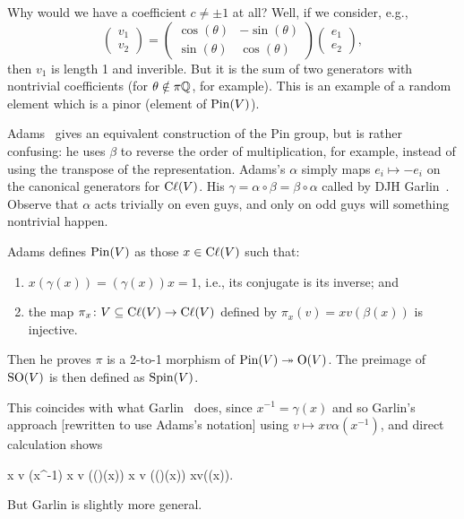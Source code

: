 Why would we have a coefficient $c\neq\pm1$ at all? Well, if we
consider, e.g.,
\begin{equation}
\begin{pmatrix}
v_{1}\\ v_{2}
\end{pmatrix} = \begin{pmatrix}\cos(\theta) & -\sin(\theta)\\
\sin(\theta) & \cos(\theta)
\end{pmatrix}
\begin{pmatrix}
e_{1}\\ e_{2}
\end{pmatrix},
\end{equation}
then $v_{1}$ is length 1 and inverible. But it is the sum of two
generators with nontrivial coefficients (for $\theta\notin\pi\mathbb{Q}$, for
example). This is an example of a random element which is a pinor
(element of $\operatorname{Pin}(V)$).

\begin{remark}
Adams~\cite{adams1996:ex} gives an equivalent construction of the Pin
group, but is rather confusing: he uses $\beta$ to reverse the order of
multiplication, for example, instead of using the transpose of the
representation. Adams's $\alpha$ simply maps $e_{i}\mapsto-e_{i}$ on the
canonical generators for $\mathrm{C}\ell(V)$. His
$\gamma=\alpha\circ\beta=\beta\circ\alpha$ called 
by DJH Garlin~\cite[pg.94]{Garling:2011zz}. Observe that $\alpha$ acts
trivially on even guys, and only on odd guys will something nontrivial
happen. 
\end{remark}

\begin{remark}
Adams defines $\operatorname{Pin}(V)$ as those $x\in\mathrm{C}\ell(V)$ such that:
\begin{enumerate}
\item $x(\gamma(x))=(\gamma(x))x=1$, i.e., its conjugate is its inverse; and
\item the map $\pi_{x}\colon V\subseteq\mathrm{C}\ell(V)\to\mathrm{C}\ell(V)$ defined by $\pi_{x}(v)=xv(\beta(x))$
is injective.
\end{enumerate}
Then he proves $\pi$ is a 2-to-1 morphism of $\operatorname{Pin}(V)\twoheadrightarrow\mathrm{O}(V)$. The
preimage of $\operatorname{SO}(V)$ is then defined as $\operatorname{Spin}(V)$.

This coincides with what Garlin~\cite[ch.8]{Garling:2011zz} does, since
$x^{-1}=\gamma(x)$ and so Garlin's approach [rewritten to use Adams's
  notation] using $v\mapsto x v \alpha(x^{-1})$, and direct calculation
shows
\begin{calculation}
  x v \alpha(x^{-1})
  x v ((\alpha\circ\gamma)(x))
x v ((\alpha\circ\alpha\circ\beta)(x))
xv(\beta(x)).
\end{calculation}
But Garlin is slightly more general.
\end{remark}

